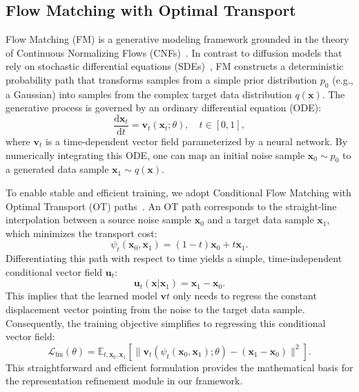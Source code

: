 \subsection{Flow Matching with Optimal Transport}
Flow Matching (FM) is a generative modeling framework grounded in the theory of Continuous Normalizing Flows (CNFs)~\cite{chen2018neural,grathwohl2018ffjord}. In contrast to diffusion models that rely on stochastic differential equations (SDEs)~\cite{ho2020denoising,song2020score}, FM constructs a deterministic probability path that transforms samples from a simple prior distribution $p_0$ (e.g., a Gaussian) into samples from the complex target data distribution $q(\mathbf{x})$.
The generative process is governed by an ordinary differential equation (ODE):
\begin{equation}
	\frac{\mathrm{d}\mathbf{x}_t}{\mathrm{d}t} = \mathbf{v}_t(\mathbf{x}_t; \theta), \quad t \in [0, 1],
\end{equation}
where $\mathbf{v}_t$ is a time-dependent vector field parameterized by a neural network. By numerically integrating this ODE, one can map an initial noise sample $\mathbf{x}_0 \sim p_0$ to a generated data sample $\mathbf{x}_1 \sim q(\mathbf{x})$.

To enable stable and efficient training, we adopt Conditional Flow Matching with Optimal Transport (OT) paths~\cite{tong2024improving}. An OT path corresponds to the straight-line interpolation between a source noise sample $\mathbf{x}_0$ and a target data sample $\mathbf{x}_1$, which minimizes the transport cost:
\begin{equation}
	\psi_t(\mathbf{x}_0, \mathbf{x}_1) = (1 - t)\mathbf{x}_0 + t \mathbf{x}_1.
\end{equation}
Differentiating this path with respect to time yields a simple, time-independent conditional vector field $\mathbf{u}_t$:
\begin{equation}
	\mathbf{u}_t(\mathbf{x} | \mathbf{x}_1) = \mathbf{x}_1 - \mathbf{x}_0.
\end{equation}
This implies that the learned model $\mathbf{v}t$ only needs to regress the constant displacement vector pointing from the noise to the target data sample. Consequently, the training objective simplifies to regressing this conditional vector field:
\begin{equation}
	\mathcal{L}_{\text{fm}}(\theta) = \mathbb{E}_{t, \mathbf{x}_0, \mathbf{x}_1} \left[ \| \mathbf{v}_t(\psi_t(\mathbf{x}_0, \mathbf{x}_1); \theta) - (\mathbf{x}_1 - \mathbf{x}_0) \|^2 \right].
	\label{eq:fm_loss}
\end{equation}
This straightforward and efficient formulation provides the mathematical basis for the representation refinement module in our framework.


